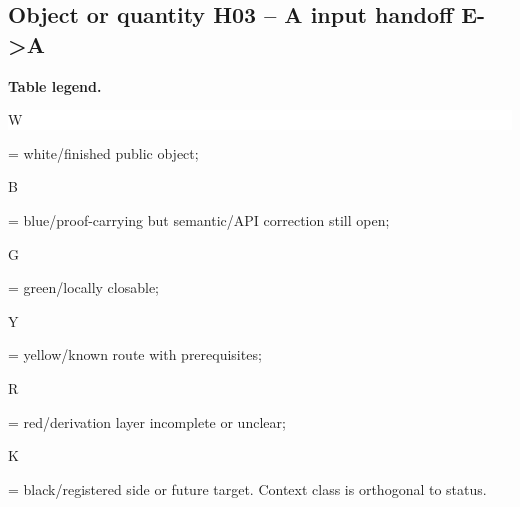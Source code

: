 \subsection*{Object or quantity H03 -- A input handoff E->A}
\hypertarget{objproof:H03}{}
\par\smallskip\noindent\begin{minipage}{0.99\linewidth}\footnotesize\raggedright\textbf{Table legend.} \colorbox{white}{\strut W} = white/finished public object; \colorbox{cyan!20}{\strut B} = blue/proof-carrying but semantic/API correction still open; \colorbox{green!18}{\strut G} = green/locally closable; \colorbox{yellow!25}{\strut Y} = yellow/known route with prerequisites; \colorbox{red!20}{\strut R} = red/derivation layer incomplete or unclear; \colorbox{black!18}{\strut K} = black/registered side or future target. Context class is orthogonal to status.\end{minipage}\par\vspace{0.25em}
